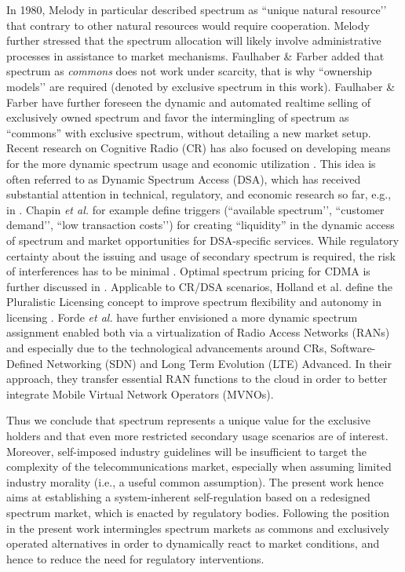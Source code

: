 \documentclass[conference]{IEEEtran}
\begin{document}
In 1980, Melody \cite{melody1980radio} in particular described spectrum as ``unique natural resource’’ that contrary to other natural resources would require cooperation. Melody further stressed that the spectrum allocation will likely involve administrative processes in assistance to market mechanisms. Faulhaber \& Farber \cite{faulhaber2003spectrum} added that spectrum as \textit{commons} does not work under scarcity, that is why ``ownership models’’ are required (denoted by exclusive spectrum in this work). Faulhaber \& Farber have further foreseen the dynamic and automated realtime selling of exclusively owned spectrum and favor the intermingling of spectrum as ``commons'' with exclusive spectrum, without detailing a new market setup. Recent research on Cognitive Radio (CR) has also focused on developing means for the more dynamic spectrum usage and economic utilization \cite{niyato2008market}. This idea is often referred to as Dynamic Spectrum Access (DSA), which has received substantial attention in technical, regulatory, and economic research so far, e.g., in \cite{chapin2007,rodriguez2005market}. Chapin \textit{et al.} for example define triggers (``available spectrum’’, ``customer demand’’, ``low transaction costs’’) for creating ``liquidity'' in the dynamic access of spectrum and market opportunities for DSA-specific services. While regulatory certainty about the issuing and usage of secondary spectrum is required, the risk of interferences has to be minimal \cite{chapin2007}. Optimal spectrum pricing for CDMA is further discussed in \cite{rodriguez2005market}.  Applicable to CR/DSA scenarios, Holland et al. define the Pluralistic Licensing concept to improve spectrum flexibility and autonomy in licensing \cite{holland2012pluralistic}. Forde \textit{et al.} \cite{forde2011exclusive} have further envisioned a more dynamic spectrum assignment enabled both via a virtualization of Radio Access Networks (RANs) and especially due to the technological advancements around CRs, Software-Defined Networking (SDN) and Long Term Evolution (LTE) Advanced. In their approach, they transfer essential RAN functions to the cloud in order to better integrate Mobile Virtual Network Operators (MVNOs).






Thus we conclude that spectrum represents a unique value for the exclusive holders and that even more restricted secondary usage scenarios are of interest. Moreover, self-imposed industry guidelines will be insufficient to target the complexity of the telecommunications market, especially when assuming limited industry morality (i.e., a useful common assumption). The present work hence aims at establishing a system-inherent self-regulation based on a redesigned spectrum market, which is enacted by regulatory bodies. Following the position in \cite{faulhaber2003spectrum} the present work intermingles spectrum markets as commons and exclusively operated alternatives in order to dynamically react to market conditions, and hence to reduce the need for regulatory interventions. 
\end{document}
